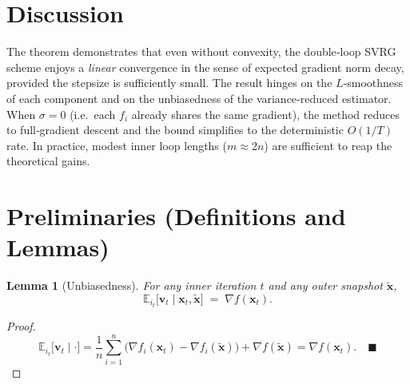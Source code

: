 \documentclass{article}
\newtheorem{lemma}{Lemma}[section]
\newcommand{\EE}{\mathbb{E}}
\newcommand{\grad}{\nabla}
\begin{document}
\section*{Discussion}
The theorem demonstrates that even without convexity, the double‑loop
SVRG scheme enjoys a \emph{linear} convergence in the sense of
expected gradient norm decay, provided the stepsize is sufficiently small.
The result hinges on the $L$‑smoothness of each component and on the
unbiasedness of the variance‑reduced estimator.
When $\sigma=0$ (i.e.\ each $f_i$ already shares the same gradient), the
method reduces to full‑gradient descent and the bound simplifies to the
deterministic $O(1/T)$ rate.  In practice, modest inner loop lengths
($m\approx 2n$) are sufficient to reap the theoretical gains.

\newpage
\section*{Preliminaries (Definitions and Lemmas)}
\begin{lemma}[Unbiasedness]\label{lem:unbiased}
For any inner iteration $t$ and any outer snapshot $\tilde{\mathbf{x}}$,
\[
\EE_{i_t}\!\big[\mathbf{v}_t\mid \mathbf{x}_t,\tilde{\mathbf{x}}\big]
\;=\;\grad f(\mathbf{x}_t).
\]
\end{lemma}
\begin{proof}
\[
\EE_{i_t}\!\big[\mathbf{v}_t\mid\cdot\big]
=\frac{1}{n}\sum_{i=1}^{n}\big(\grad f_i(\mathbf{x}_t)-\grad f_i(\tilde{\mathbf{x}})\big)
+\grad f(\tilde{\mathbf{x}})
=\grad f(\mathbf{x}_t). \quad\blacksquare
\]
\end{proof}
\end{document}
